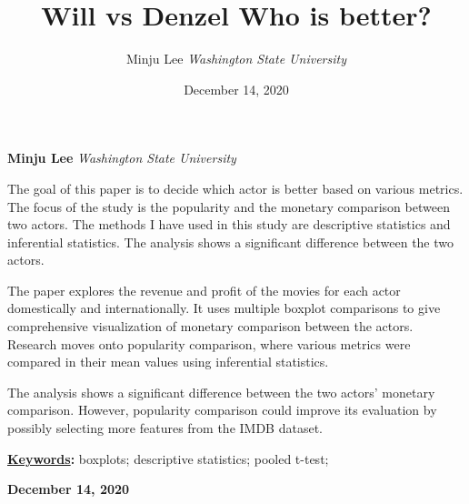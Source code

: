 \documentclass[]{article}
\title{\textbf{\textcolor{WSU.crimson}{Will vs
Denzel}} \newline \textbf{\textcolor{WSU.gray}{Who is better?}}  }
\author{\Large Minju
Lee\vspace{0.05in} \newline\normalsize\emph{Washington State
University}  }
\date{December 14, 2020}
\newcommand*{\authorfont}{\fontfamily{phv}\selectfont}
\renewenvironment{abstract}
 {{%
    \setlength{\leftmargin}{0mm}
    \setlength{\rightmargin}{\leftmargin}%
  }%
  \relax}
 {\endlist}
\begin{document}
	
%    


{%
\setlength{\parindent}{0pt}
\thispagestyle{plain}
{\fontsize{18}{20}\selectfont\raggedright 
\maketitle  %

}

{
   \vskip 13.5pt\relax \normalsize\fontsize{11}{12} 
   
\textbf{\authorfont Minju Lee} \hskip 15pt \emph{\small Washington State
University}   

}

}








\begin{abstract}

    \hbox{\vrule height .2pt width 39.14pc}

    \vskip 8.5pt %

\noindent The goal of this paper is to decide which actor is better
based on various metrics. The focus of the study is the popularity and
the monetary comparison between two actors. The methods I have used in
this study are descriptive statistics and inferential statistics. The
analysis shows a significant difference between the two actors.
\vspace{0.25in}

\noindent The paper explores the revenue and profit of the movies for
each actor domestically and internationally. It uses multiple boxplot
comparisons to give comprehensive visualization of monetary comparison
between the actors. Research moves onto popularity comparison, where
various metrics were compared in their mean values using inferential
statistics. \vspace{0.25in}

\noindent The analysis shows a significant difference between the two
actors' monetary comparison. However, popularity comparison could
improve its evaluation by possibly selecting more features from the IMDB
dataset.\vspace{0.25in}


\vskip 8.5pt \noindent \textbf{\underline{Keywords}:} boxplots;
descriptive statistics; pooled t-test; \par

    




    
    \hbox{\vrule height .2pt width 39.14pc}
    \vskip 5pt 
    \hfill \textbf{\textcolor{WSU.gray}{ December 14, 2020 } }
    \vskip 5pt 
    
\end{abstract}
\end{document}
